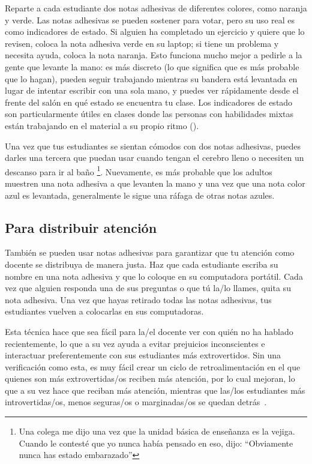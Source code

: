 Reparte a cada estudiante dos notas adhesivas de diferentes colores,
como naranja y verde.
Las notas adhesivas se pueden sostener para votar,
pero su uso real es como indicadores de estado.
Si alguien ha completado un ejercicio y quiere que lo revisen,
coloca la nota adhesiva verde en su laptop;
si tiene un problema y necesita ayuda,
coloca la nota naranja.
Esto funciona mucho mejor a pedirle a la gente que levante la mano:
es más discreto (lo que significa que es más probable que lo hagan),
pueden seguir trabajando mientras su bandera está levantada en lugar de intentar escribir con una sola mano,
y puedes ver rápidamente desde el frente del salón en qué estado se encuentra tu clase.
Los indicadores de estado son particularmente útiles en clases donde las personas con habilidades mixtas
están trabajando en el material a su propio ritmo ().

Una vez que tus estudiantes se sientan cómodos con dos notas adhesivas,
puedes darles una tercera que puedan usar cuando tengan el cerebro lleno
o necesiten un descanso para ir al baño \footnote{Una colega me dijo una vez que
la unidad básica de enseñanza es la vejiga.
Cuando le contesté que yo nunca había pensado en eso,
dijo: ``Obviamente nunca has estado embarazado''}.
Nuevamente,
es más probable que los adultos muestren una nota adhesiva a que levanten la mano
y una vez que una nota color azul es levantada,
generalmente le sigue una ráfaga de otras notas azules.

\subsection*{Para distribuir atención}

También se pueden usar notas adhesivas para garantizar que tu atención como docente se distribuya de manera justa.
Haz que cada estudiante escriba su nombre en una nota adhesiva
y que lo coloque en su computadora portátil.
Cada vez que alguien responda una de sus preguntas o que tú la/lo llames,
quita su nota adhesiva.
Una vez que hayas retirado todas las notas adhesivas,
tus estudiantes vuelven a colocarlas en sus computadoras.

Esta técnica hace que sea fácil para la/el docente ver con quién no ha hablado recientemente,
lo que a su vez ayuda a evitar prejuicios inconscientes
e interactuar preferentemente con sus estudiantes más extrovertidos.
Sin una verificación como esta,
es muy fácil crear un ciclo de retroalimentación en el que quienes son más extrovertidas/os reciben más atención,
por lo cual mejoran,
lo que a su vez hace que reciban más atención,
mientras que las/los estudiantes más introvertidas/os, menos seguras/os o marginadas/os se quedan detrás~\cite{Alvi1999,Juss2005}.

